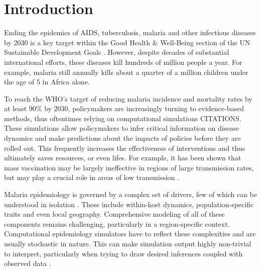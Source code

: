 \documentclass{article}
\begin{document}
\section{Introduction}
Ending the epidemics of AIDS, tuberculosis, malaria and other infectious diseases by 2030 is a key target within the Good Health \& Well-Being section of the UN Sustainable Development Goals \cite{refugees_2030,un_sustainable2018}. 
However, despite decades of substantial international efforts, these diseases kill hundreds of million people a year.
For example, malaria still annually kills about a quarter of a million children under the age of 5 in Africa alone.



To reach the WHO’s target of reducing malaria incidence and mortality rates by at least 90\% by 2030, policymakers are increasingly turning to evidence-based methods, thus oftentimes relying on computational simulations CITATIONS. 
These simulations allow policymakers to infer critical information on disease dynamics and make predictions about the impacts of policies
before they are rolled out. This frequently increases the effectiveness of interventions and thus ultimately saves resources, or even lifes.
For example, it has been shown that mass vaccination may be largely ineffective in regions of large transmission rates, but may play a crucial role in areas of low transmission \cite{cameron2015defining}. 

Malaria epidemiology is governed by a complex set of drivers, 
few of which can be understood in isolation \cite{cameron2015defining,autino_epidemiology_2012,smith2008towards,bershteyn2018implementation}.
These include within-host dynamics, population-specific traits and even local geography.
Comprehensive modeling of all of these components remains challenging, particularly in a region-specific context. 
Computational epidemiology simulators have to reflect these complexities and are usually stochastic in nature. This can make simulation output highly non-trivial to interpret, particularly when trying to draw desired inferences coupled with observed data \cite{mwendera_challenges_2019,ferris_openmalaria_2015}.
\end{document}
